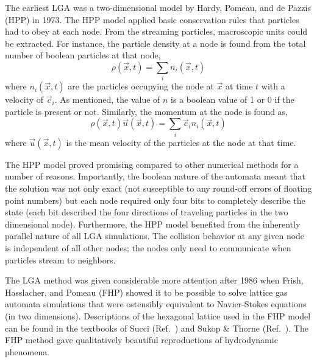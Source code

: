 The earliest LGA was a two-dimensional model by Hardy, Pomeau, and de Pazzis (HPP) in 1973.\cite{Hardy1975} The HPP model applied basic conservation rules that particles had to obey at each node. From the streaming particles, macroscopic units could be extracted. For instance, the particle density at a node is found from the total number of boolean particles at that node,
\begin{equation}
	\rho(\vec{x},t) = \sum_i n_i(\vec{x},t)
\end{equation}
where $n_i(\vec{x},t)$ are the particles occupying the node at $\vec{x}$ at time $t$ with a velocity of $\vec{c}_i$. As mentioned, the value of $n$ is a boolean value of 1 or 0 if the particle is present or not. Similarly, the momentum at the node is found as,
\begin{equation}
	\rho(\vec{x},t)\vec{u}(\vec{x},t) = \sum_i \vec{c}_in_i(\vec{x},t)
\end{equation}
where $\vec{u}(\vec{x},t)$ is the mean velocity of the particles at the node at that time.

The HPP model proved promising compared to other numerical methods for a number of reasons. Importantly, the boolean nature of the automata meant that the solution was not only exact (not susceptible to any round-off errors of floating point numbers) but each node required only four bits to completely describe the state (each bit described the four directions of traveling particles in the two dimensional node).\cite{Hardy1975} Furthermore, the HPP model benefited from the inherently parallel nature of all LGA simulations. The collision behavior at any given node is independent of all other nodes; the nodes only need to communicate when particles stream to neighbors.\cite{succi2001lattice}

The LGA method was given considerable more attention after 1986 when Frish, Hasslacher, and Pomeau (FHP) showed it to be possible to solve lattice gas automata simulations that were ostensibly equivalent to Navier-Stokes equations (in two dimensions).\cite{Frisch1986} Descriptions of the hexagonal lattice used in the FHP model can be found in the textbooks of Succi (Ref.~\cite{succi2001lattice}) and Sukop \& Thorne (Ref.~\cite{Sukop2007}). The FHP method gave qualitatively beautiful reproductions of hydrodynamic phenomena.

